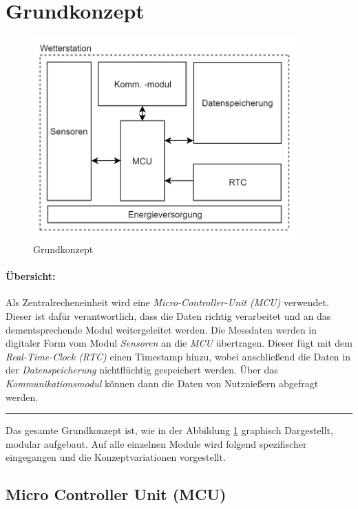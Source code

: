 \section{Grundkonzept}
\begin{figure}[h]
	\centering
	\includegraphics[width=0.9\textwidth]{graphics/Grundkonzept.PNG}
	\caption{Grundkonzept}
	\label{fig:grundkonzept}
\end{figure}

\paragraph{Übersicht:}
Als Zentralrecheneinheit wird eine \textit{Micro-Controller-Unit (MCU)} verwendet. Dieser ist dafür verantwortlich, dass die Daten richtig verarbeitet und an das dementsprechende Modul weitergeleitet werden. Die Messdaten werden in digitaler Form vom Modul \textit{Sensoren} an die \textit{MCU} übertragen. Dieser fügt mit dem \textit{Real-Time-Clock (RTC)} einen Timestamp hinzu, wobei anschließend die Daten in der \textit{Datenspeicherung} nichtflüchtig gespeichert werden. Über das \textit{Kommunikationsmodul} können dann die Daten von Nutznießern abgefragt werden.

\vspace{0.5cm}
\hrule
\vspace{0.25cm}

Das gesamte Grundkonzept ist, wie in der Abbildung \ref{fig:grundkonzept} graphisch Dargestellt, modular aufgebaut. Auf alle einzelnen Module wird folgend spezifischer eingegangen und die Konzeptvariationen vorgestellt.
\newpage
\subsection{Micro Controller Unit (MCU)}

